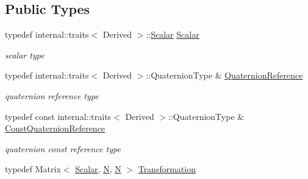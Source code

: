 \subsection*{Public Types}
\begin{DoxyCompactItemize}
\item 
typedef internal\+::traits$<$ Derived $>$\+::\hyperlink{class_sophus_1_1_s_o3_group_base_a31bf31815c195b7150da8a8e8c6f0189}{Scalar} \hyperlink{class_sophus_1_1_s_o3_group_base_a31bf31815c195b7150da8a8e8c6f0189}{Scalar}\hypertarget{class_sophus_1_1_s_o3_group_base_a31bf31815c195b7150da8a8e8c6f0189}{}\label{class_sophus_1_1_s_o3_group_base_a31bf31815c195b7150da8a8e8c6f0189}

\begin{DoxyCompactList}\small\item\em scalar type \end{DoxyCompactList}\item 
typedef internal\+::traits$<$ Derived $>$\+::Quaternion\+Type \& \hyperlink{class_sophus_1_1_s_o3_group_base_af58920cc70e59d58dcf427a22ebacaeb}{Quaternion\+Reference}\hypertarget{class_sophus_1_1_s_o3_group_base_af58920cc70e59d58dcf427a22ebacaeb}{}\label{class_sophus_1_1_s_o3_group_base_af58920cc70e59d58dcf427a22ebacaeb}

\begin{DoxyCompactList}\small\item\em quaternion reference type \end{DoxyCompactList}\item 
typedef const internal\+::traits$<$ Derived $>$\+::Quaternion\+Type \& \hyperlink{class_sophus_1_1_s_o3_group_base_a8a5a23aee10f2850a5894b7c1f5e6654}{Const\+Quaternion\+Reference}\hypertarget{class_sophus_1_1_s_o3_group_base_a8a5a23aee10f2850a5894b7c1f5e6654}{}\label{class_sophus_1_1_s_o3_group_base_a8a5a23aee10f2850a5894b7c1f5e6654}

\begin{DoxyCompactList}\small\item\em quaternion const reference type \end{DoxyCompactList}\item 
typedef Matrix$<$ \hyperlink{class_sophus_1_1_s_o3_group_base_a31bf31815c195b7150da8a8e8c6f0189}{Scalar}, \hyperlink{class_sophus_1_1_s_o3_group_base_ad7937061e3b4eab530142d5e1a1921c2}{N}, \hyperlink{class_sophus_1_1_s_o3_group_base_ad7937061e3b4eab530142d5e1a1921c2}{N} $>$ \hyperlink{class_sophus_1_1_s_o3_group_base_aa20fc57bf1b355a6616f5c4b785f1fc5}{Transformation}\hypertarget{class_sophus_1_1_s_o3_group_base_aa20fc57bf1b355a6616f5c4b785f1fc5}{}\label{class_sophus_1_1_s_o3_group_base_aa20fc57bf1b355a6616f5c4b785f1fc5}


\end{DoxyCompactItemize}
